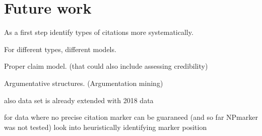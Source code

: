 \chapter{Future work}
As a first step identify types of citations more systematically.

For different types, different models.

Proper claim model. (that could also include assessing credibility\cite{Popat2016})

Argumentative structures. (Argumentation mining\cite{Stab2016,Lippi2016,Habernal2017})

also data set is already extended with 2018 data

for data where no precise citation marker can be guaraneed (and so far NPmarker was not tested) look into heuristically identifying marker position
